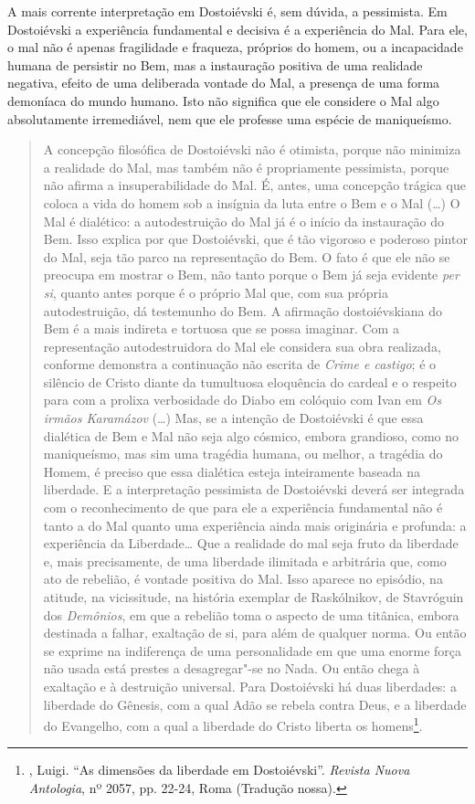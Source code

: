{{A mais corrente interpretação em Dostoiévski é, sem dúvida, a
pessimista. Em Dostoiévski a experiência fundamental e decisiva é a
experiência do Mal. Para ele, o mal não é apenas fragilidade e fraqueza,
próprios do homem, ou a incapacidade humana de persistir no Bem, mas a
instauração positiva de uma realidade negativa, efeito de uma deliberada
vontade do Mal, a presença de uma forma demoníaca do mundo humano. Isto
não significa que ele considere o Mal algo absolutamente irremediável,
nem que ele professe uma espécie de maniqueísmo.

\begin{quote}
A concepção filosófica de Dostoiévski não é otimista, porque não
minimiza a realidade do Mal, mas também não é propriamente pessimista,
porque não afirma a insuperabilidade do Mal. É, antes, uma concepção
trágica que coloca a vida do homem sob a insígnia da luta entre o Bem e
o Mal (\ldots{}) O Mal é dialético: a autodestruição do Mal já é o início da
instauração do Bem. Isso explica por que Dostoiévski, que é tão vigoroso
e poderoso pintor do Mal, seja tão parco na representação do Bem. O fato
é que ele não se preocupa em mostrar o Bem, não tanto porque o Bem já
seja evidente \emph{per si}, quanto antes porque é o próprio Mal que,
com sua própria autodestruição, dá testemunho do Bem. A afirmação
dostoiévskiana do Bem é a mais indireta e tortuosa que se possa
imaginar. Com a representação autodestruidora do Mal ele considera sua
obra realizada, conforme demonstra a continuação não escrita de
\emph{Crime e castigo}; é o silêncio de Cristo diante da tumultuosa
eloquência do cardeal e o respeito para com a prolixa verbosidade do
Diabo em colóquio com Ivan em \emph{Os irmãos Karamázov} (\ldots{}) Mas, se a
intenção de Dostoiévski é que essa dialética de Bem e Mal não seja algo
cósmico, embora grandioso, como no maniqueísmo, mas sim uma tragédia
humana, ou melhor, a tragédia do Homem, é preciso que essa dialética
esteja inteiramente baseada na liberdade. E a interpretação pessimista
de Dostoiévski deverá ser integrada com o reconhecimento de que para ele
a experiência fundamental não é tanto a do Mal quanto uma experiência
ainda mais originária e profunda: a experiência da Liberdade\ldots{} Que a
realidade do mal seja fruto da liberdade e, mais precisamente, de uma
liberdade ilimitada e arbitrária que, como ato de rebelião, é vontade
positiva do Mal. Isso aparece no episódio, na atitude, na vicissitude,
na história exemplar de Raskólnikov, de Stavróguin dos \emph{Demônios},
em que a rebelião toma o aspecto de uma titânica, embora destinada a
falhar, exaltação de si, para além de qualquer norma. Ou então se
exprime na indiferença de uma personalidade em que uma enorme força não
usada está prestes a desagregar"-se no Nada. Ou então chega à exaltação e
à destruição universal. Para Dostoiévski há duas liberdades: a liberdade
do Gênesis, com a qual Adão se rebela contra Deus, e a liberdade do
Evangelho, com a qual a liberdade do Cristo liberta os homens\footnote{,
  Luigi. ``As dimensões da liberdade em Dostoiévski''. \emph{Revista Nuova
  Antologia}, nº 2057, pp. 22-24, Roma (Tradução nossa).}.
\end{quote}

}}
